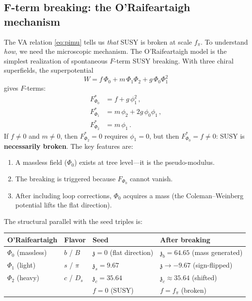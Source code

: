 \documentclass[12pt,a4paper]{article}
\newcommand{\zch}{\mathfrak{z}}
\begin{document}
\subsection{F-term breaking: the O'Raifeartaigh mechanism}
\label{subsec:fterm}

The VA relation \eqref{eq:pimu} tells us \emph{that} SUSY is broken at 
scale $f_\pi$. To understand \emph{how}, we need the microscopic 
mechanism. The O'Raifeartaigh model \cite{ORaifeartaigh} is the simplest 
realization of spontaneous $F$-term SUSY breaking. With three chiral 
superfields, the superpotential
\begin{equation}
W = f\,\Phi_0 + m\,\Phi_1\Phi_2 + g\,\Phi_0\Phi_1^2
\end{equation}
gives $F$-terms:
\begin{align}
F_{\Phi_0}^* &= f + g\,\phi_1^2\,, \\
F_{\Phi_1}^* &= m\,\phi_2 + 2g\,\phi_0\phi_1\,, \\
F_{\Phi_2}^* &= m\,\phi_1\,.
\end{align}
If $f \neq 0$ and $m \neq 0$, then $F_{\Phi_2}^* = 0$ requires 
$\phi_1 = 0$, but then $F_{\Phi_0}^* = f \neq 0$: SUSY is 
\textbf{necessarily broken}. The key features are:
\begin{enumerate}
\item A massless field ($\Phi_0$) exists at tree level---it is the 
pseudo-modulus.
\item The breaking is triggered because $F_{\Phi_0}$ cannot vanish.
\item After including loop corrections, $\Phi_0$ acquires a mass 
(the Coleman--Weinberg potential lifts the flat direction).
\end{enumerate}

The structural parallel with the seed triples is:

\begin{center}
\begin{tabular}{llll}
\toprule
O'Raifeartaigh & Flavor & Seed & After breaking \\
\midrule
$\Phi_0$ (massless) & $b$ / $B$ & $\zch = 0$ (flat direction) & $\zch_b = 64.65$ (mass generated) \\
$\Phi_1$ (light) & $s$ / $\pi$ & $\zch_s = 9.67$ & $\zch \to -9.67$ (sign-flipped) \\
$\Phi_2$ (heavy) & $c$ / $D_s$ & $\zch_c = 35.64$ & $\zch_c \approx 35.64$ (shifted) \\
\midrule
 & & $f = 0$ (SUSY) & $f = f_\pi$ (broken) \\
\bottomrule
\end{tabular}
\end{center}
\end{document}
